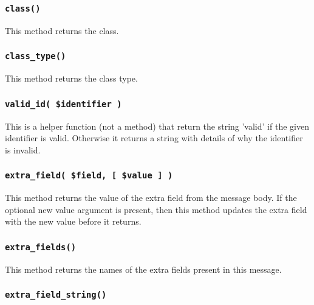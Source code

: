 \subsubsection*{\texttt{class()}\label{xPL::Message_class_}}


This method returns the class.

\subsubsection*{\texttt{class\_type()}\label{xPL::Message_class_type_}}


This method returns the class type.

\subsubsection*{\texttt{valid\_id( \$identifier )}\label{xPL::Message_valid_id_identifier_}}


This is a helper function (not a method) that return the string
'valid' if the given identifier is valid.  Otherwise it returns a
string with details of why the identifier is invalid.

\subsubsection*{\texttt{extra\_field( \$field, [ \$value ] )}\label{xPL::Message_extra_field_field_value_}}


This method returns the value of the extra field from the message
body.  If the optional new value argument is present, then this method
updates the extra field with the new value before it returns.

\subsubsection*{\texttt{extra\_fields()}\label{xPL::Message_extra_fields_}}


This method returns the names of the extra fields present in this
message.

\subsubsection*{\texttt{extra\_field\_string()}\label{xPL::Message_extra_field_string_}}


